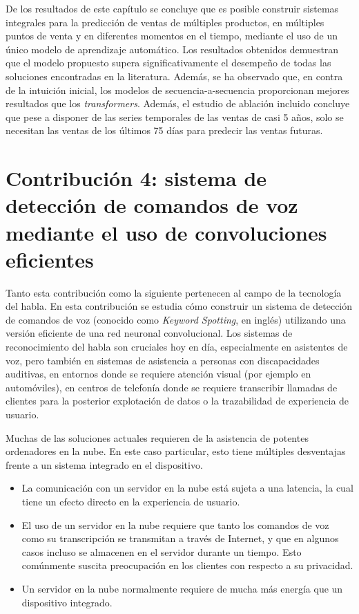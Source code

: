 De los resultados de este capítulo se concluye que es posible construir sistemas integrales para la predicción de ventas de múltiples productos, en múltiples puntos de venta y en diferentes momentos en el tiempo, mediante el uso de un único modelo de aprendizaje automático. Los resultados obtenidos demuestran que el modelo propuesto supera significativamente el desempeño de todas las soluciones encontradas en la literatura. Además, se ha observado que, en contra de la intuición inicial, los modelos de secuencia-a-secuencia proporcionan mejores resultados que los \textit{transformers}. Además, el estudio de ablación incluido concluye que pese a disponer de las series temporales de las ventas de casi 5 años, solo se necesitan las ventas de los últimos 75 días para predecir las ventas futuras.

\section*{Contribución 4: sistema de detección de comandos de voz mediante el uso de convoluciones eficientes}

Tanto esta contribución como la siguiente pertenecen al campo de la tecnología del habla. En esta contribución se estudia cómo construir un sistema de detección de comandos de voz (conocido como \textit{Keyword Spotting}, en inglés) utilizando una versión eficiente de una red neuronal convolucional. Los sistemas de reconocimiento del habla son cruciales hoy en día, especialmente en asistentes de voz, pero también en sistemas de asistencia a personas con discapacidades auditivas, en entornos donde se requiere atención visual (por ejemplo en automóviles), en centros de telefonía donde se requiere transcribir llamadas de clientes para la posterior explotación de datos o la trazabilidad de experiencia de usuario. 

Muchas de las soluciones actuales requieren de la asistencia de potentes ordenadores en la nube. En este caso particular, esto tiene múltiples desventajas frente a un sistema integrado en el dispositivo.

\begin{itemize}
	\item La comunicación con un servidor en la nube está sujeta a una latencia, la cual tiene un efecto directo en la experiencia de usuario.
	\item El uso de un servidor en la nube requiere que tanto los comandos de voz como su transcripción se transmitan a través de Internet, y que en algunos casos incluso se almacenen en el servidor durante un tiempo. Esto comúnmente suscita preocupación en los clientes con respecto a su privacidad. 
	\item Un servidor en la nube normalmente requiere de mucha más energía que un dispositivo integrado.
\end{itemize}

